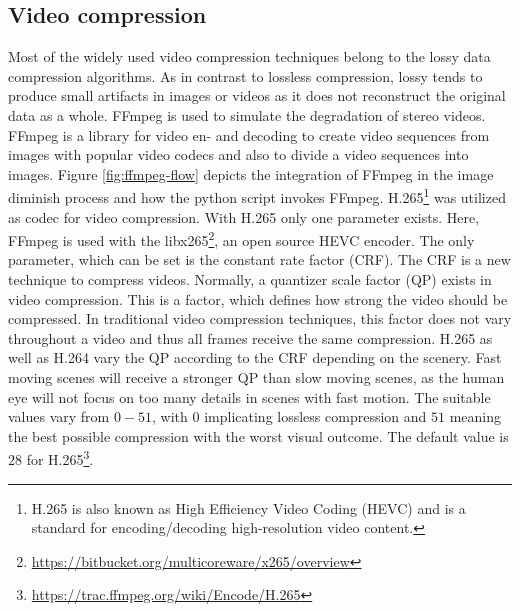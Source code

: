 \subsection*{Video compression}

Most of the widely used video compression techniques belong to the lossy data compression algorithms.
As in contrast to lossless compression, lossy tends to produce small artifacts in images or videos as it does not reconstruct the original data as a whole.
FFmpeg \citep{FFMPEG2010} is used to simulate the degradation of stereo videos.
FFmpeg is a library for video en- and decoding to create video sequences from images with popular video codecs and also to divide a video sequences into images.
Figure \ref{fig:ffmpeg-flow} depicts the integration of FFmpeg in the image diminish process and how the python script invokes FFmpeg.
H.265\footnote{H.265 is also known as High Efficiency Video Coding (HEVC) and is a standard for encoding/decoding high-resolution video content.} was utilized as codec for video compression.
With H.265 only one parameter exists.
Here, FFmpeg is used with the libx265\footnote{\url{https://bitbucket.org/multicoreware/x265/overview}}, an open source HEVC encoder.
The only parameter, which can be set is the constant rate factor (CRF).
The CRF is a new technique to compress videos.
Normally, a quantizer scale factor (QP) exists in video compression.
This is a factor, which defines how strong the video should be compressed.
In traditional video compression techniques, this factor does not vary throughout a video and thus all frames receive the same compression.
H.265 as well as H.264 vary the QP according to the CRF depending on the scenery.
Fast moving scenes will receive a stronger QP than slow moving scenes, as the human eye will not focus on too many details in scenes with fast motion.
The suitable values vary from $0-51$, with $0$ implicating lossless compression and $51$ meaning the best possible compression with the worst visual outcome.
The default value is $28$ for H.265\footnote{\url{https://trac.ffmpeg.org/wiki/Encode/H.265}}.


